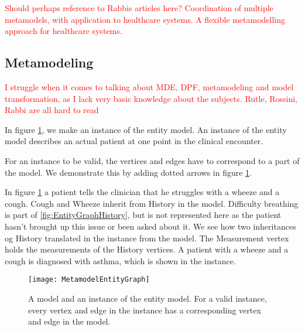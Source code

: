 \textcolor{red}{Should perhaps reference to Rabbis articles here? 
	Coordination	of multiple metamodels, with application	to healthcare systems.
A flexible metamodelling approach for healthcare systems. }

\subsection{Metamodeling}

\textcolor{red}{I struggle when it comes to talking about MDE, DPF, metamodeling and model transformation, as I lack very basic knowledge about the subjects. Rutle, Rossini, Rabbi are all hard to read}

In figure \ref{fig:MetamodelEntityGraph}, we make an instance of the entity model. An instance of the entity model describes an actual patient at one point in the clinical encounter. 

For an instance to be valid, the vertices and edges have to correspond to a part of the model. We demonstrate this by adding dotted arrows in figure \ref{fig:MetamodelEntityGraph}. 

In figure \ref{fig:MetamodelEntityGraph} a patient tells the clinician that he struggles with a wheeze and a cough. Cough and Wheeze inherit from History in the model. Difficulty breathing is part of \ref{fig:EntityGraphHistory}, but is not represented here as the patient hasn't brought up this issue or been asked about it. We see how two inheritances og History translated in the instance from the model. The Measurement vertex holds the measurements of the History vertices. A patient with a wheeze and a cough is diagnosed with asthma, which is shown in the instance.
\begin{figure}[h!]
	\caption {A model and an instance of the entity model. For a valid instance, every vertex and edge in the instance has a corresponding vertex and edge in the model.}
	\label{fig:MetamodelEntityGraph}
	\texttt{[image: MetamodelEntityGraph]}
\end{figure}

